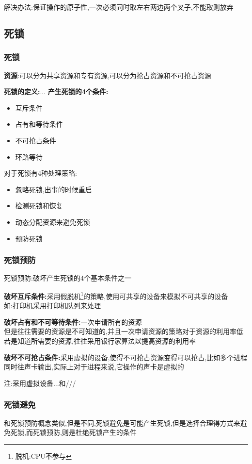 \documentclass[UTF8,a4paper]{ctexart}
\begin{document}
    解决办法:保证操作的原子性,一次必须同时取左右两边两个叉子,不能取则放弃

  \subsection{死锁}
  \subsubsection{死锁}
  \textbf{资源}:可以分为共享资源和专有资源,可以分为抢占资源和不可抢占资源

  \textbf{死锁的定义:}...
  \textbf{产生死锁的4个条件:}
    \begin{itemize}
      \item 互斥条件
      \item 占有和等待条件
      \item 不可抢占条件
      \item 环路等待
    \end{itemize}

    对于死锁有4种处理策略:
    \begin{itemize}
      \item 忽略死锁,出事的时候重启
      \item 检测死锁和恢复
      \item 动态分配资源来避免死锁
      \item 预防死锁
    \end{itemize}

  \subsubsection{死锁预防}
  死锁预防:破坏产生死锁的4个基本条件之一

  \textbf{破坏互斥条件:}采用假脱机\footnote{脱机:CPU不参与}的策略,使用可共享的设备来模拟不可共享的设备\\
  如:打印机采用打印机队列来处理

  \textbf{破坏占有和不可等待条件:}一次申请所有的资源\\
  但是往往需要的资源是不可知道的,并且一次申请资源的策略对于资源的利用率低\\
  若是知道所需要的资源,往往采用银行家算法以提高资源的利用率

  \textbf{破坏不可抢占条件:}采用虚拟的设备,使得不可抢占资源变得可以抢占,比如多个进程同时往声卡输出,实际上对于进程来说,它操作的声卡是虚拟的

  注:采用虚拟设备...和///

  \subsubsection{死锁避免}
  和死锁预防概念类似,但是不同,死锁避免是可能产生死锁,但是选择合理得方式来避免死锁,而死锁预防,则是杜绝死锁产生的条件
\end{document}
